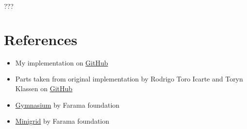 \documentclass[12pt, a4paper]{article}
\begin{document}
???

\section*{References}

\begin{itemize}
	\item My implementation on \href{https://github.com/maxstollmayer/Reward-Machines}{GitHub}
	\item Parts taken from original implementation by Rodrigo Toro Icarte and Toryn Klassen on \href{https://github.com/RodrigoToroIcarte/reward_machines}{GitHub}
	\item \href{https://gymnasium.farama.org/}{Gymnasium} by Farama foundation
	\item \href{https://minigrid.farama.org/environments/minigrid/DoorKeyEnv/}{Minigrid} by Farama foundation
\end{itemize}
\end{document}
